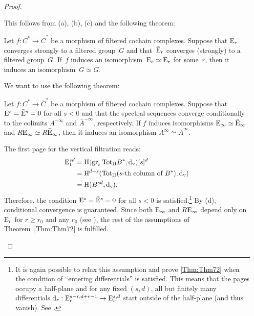 \documentclass[\MainFolder/Text.tex]{subfiles}
\begin{document}
\begin{proof}
\begin{ProofList}
\item This follows from (a), (b), (c) and the following theorem:
\begin{ProofTheorem}
Let $f: C^* \rightarrow \bar{C}^*$ be a morphism of filtered cochain complexes. Suppose that $\mathrm{E}_r$ converges strongly to a filtered group~$G$ and that~$\bar{\mathrm{E}}_r$ converges (strongly) to a filtered group~$\bar{G}$. If~$f$ induces an isomorphism~$\mathrm{E}_r \simeq \bar{\mathrm{E}}_r$ for some~$r$, then it induces an isomorphism~$G\simeq\bar{G}$.
\end{ProofTheorem}

\item We want to use the following theorem:
\begin{ProofTheorem}\label{Thm:Thm72}
Let $f: C^* \rightarrow \bar{C}^*$ be a morphism of filtered cochain complexes. Suppose that $\mathrm{E}^s = \bar{\mathrm{E}}^s = 0$ for all $s<0$ and that the spectral sequences converge conditionally to the colimits $A^{-\infty}$ and $\bar{A}^{-\infty}$, respectively. If $f$ induces isomorphisms $\mathrm{E}_\infty \simeq \bar{\mathrm{E}}_\infty$ and $R\mathrm{E}_\infty \simeq R\bar{\mathrm{E}}_\infty$, then it induces an isomorphism $A^\infty\simeq\bar{A}^\infty$. 
\end{ProofTheorem}
The first page for the vertical filtration reads:
\begin{align*}
 \mathrm{E}_1^{sd} & = \mathrm{H}(\operatorname{\mathrm{gr}}_s {\mathrm{Tot}_{\mathrm{II}}} B^*, \mathrm{d}_{{\mathrm{v}}})[s]^d \\
                & = \mathrm{H}^{d+s}({\mathrm{Tot}_{\mathrm{II}}}(s\text{-th column of }B^*),\mathrm{d}_{{\mathrm{v}}}) \\
                & = \mathrm{H}(B^{s d},\mathrm{d}_{{\mathrm{v}}}).
\end{align*} 
Therefore, the condition $\mathrm{E}^s = \bar{\mathrm{E}}^s = 0$ for all $s<0$ is satisfied.\footnote{It is again possible to relax this assumption and prove \ref{Thm:Thm72} when the condition of ``entering differentials'' is satisfied. This means that the pages occupy a half-plane and for any fixed $(s,d)$, all but finitely many differentials $\mathrm{d}_r: \mathrm{E}_r^{s-r,d+r-1} \rightarrow \mathrm{E}_{r}^{s,d}$ start outside of the half-plane (and thus vanish). See \cite{MO336781}.} By (d), conditional convergence is guaranteed. Since both $\mathrm{E}_\infty$ and $R\mathrm{E}_\infty$ depend only on $\mathrm{E}_r$ for $r\ge r_0$ and any $r_0$ (see \cite[p.~16]{Boardmann1999}), the rest of the assumptions of Theorem~\ref{Thm:Thm72} is fulfilled.\qedhere
\end{ProofList}
\end{proof}
\end{document}
